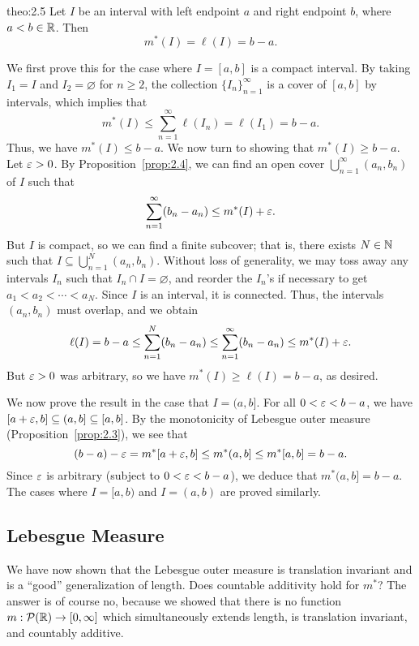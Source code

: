 \begin{theo}{theo:2.5}
    Let $I$ be an interval with left endpoint $a$ and right endpoint $b$, where 
    $a < b \in \mathbb{R}$. Then 
    \[ m^*(I) = \ell(I) = b-a. \]  
\end{theo}
\begin{pf}
    We first prove this for the case where $I = [a, b]$ is a compact interval. 
    By taking $I_1 = I$ and $I_2 = \varnothing$ for $n \geq 2$, the 
    collection $\{I_n\}_{n=1}^\infty$ is a cover of $[a, b]$ by intervals, 
    which implies that 
    \[ m^*(I) \leq \sum_{n=1}^\infty \ell(I_n) = \ell(I_1) = b-a. \] 
    Thus, we have $m^*(I) \leq b-a$. We now turn to showing that 
    $m^*(I) \geq b-a$. Let $\varepsilon > 0$. By Proposition~\ref{prop:2.4}, we can 
    find an open cover $\bigcup_{n=1}^\infty (a_n, b_n)$ of $I$ such that 
    \[ \sum_{n=1}^\infty (b_n - a_n) \leq m^*(I) + \varepsilon. \] 
    But $I$ is compact, so we can find a finite subcover; that is, 
    there exists $N \in \mathbb{N}$ such that $I \subseteq \bigcup_{n=1}^N (a_n, b_n)$. 
    Without loss of generality, we may toss away any intervals $I_n$ such that 
    $I_n \cap I = \varnothing$, and reorder the $I_n$'s if necessary to get 
    $a_1 < a_2 < \cdots < a_N$. Since $I$ is an interval, it is connected. 
    Thus, the intervals $(a_n, b_n)$ must overlap, and we obtain 
    \[ \ell(I) = b-a \leq \sum_{n=1}^N (b_n - a_n) \leq 
    \sum_{n=1}^\infty (b_n - a_n) \leq m^*(I) + \varepsilon. \] 
    But $\varepsilon > 0$ was arbitrary, so we have $m^*(I) \geq \ell(I) = b-a$, as 
    desired. 

    We now prove the result in the case that $I = (a, b]$. For all 
    $0 < \varepsilon < b-a$, we have $[a + \varepsilon, b] \subseteq (a, b] \subseteq 
    [a, b]$. By the monotonicity of Lebesgue outer measure 
    (Proposition~\ref{prop:2.3}), we see that 
    \[ (b-a) - \varepsilon = m^*[a + \varepsilon, b] \leq m^*(a, b] \leq m^*[a, b] = b-a. \] 
    Since $\varepsilon$ is arbitrary (subject to $0 < \varepsilon < b-a$), we deduce that 
    $m^*(a, b] = b-a$. The cases where $I = [a, b)$ and $I = (a, b)$ are 
    proved similarly. 
\end{pf}

\subsection{Lebesgue Measure}\label{subsec:2.3}
We have now shown that the Lebesgue outer measure is translation invariant 
and is a ``good'' generalization of length. Does countable additivity hold 
for $m^*$? The answer is of course no, because we showed that there is 
no function $m : {\cal P}(\mathbb{R}) \to [0, \infty]$ which simultaneously 
extends length, is translation invariant, and countably additive. 

